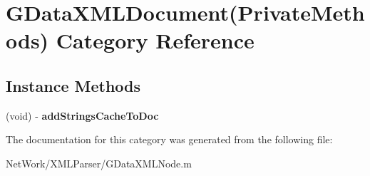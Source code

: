 \hypertarget{category_g_data_x_m_l_document_07_private_methods_08}{\section{G\+Data\+X\+M\+L\+Document(Private\+Methods) Category Reference}
\label{category_g_data_x_m_l_document_07_private_methods_08}
}
\subsection*{Instance Methods}
\begin{DoxyCompactItemize}
\item 
\hypertarget{category_g_data_x_m_l_document_07_private_methods_08_a919a4f1c9925f4d6de2c09a92bfd0f35}{(void) -\/ {\bfseries add\+Strings\+Cache\+To\+Doc}}\label{category_g_data_x_m_l_document_07_private_methods_08_a919a4f1c9925f4d6de2c09a92bfd0f35}

\end{DoxyCompactItemize}


The documentation for this category was generated from the following file\+:\begin{DoxyCompactItemize}
\item 
Net\+Work/\+X\+M\+L\+Parser/G\+Data\+X\+M\+L\+Node.\+m\end{DoxyCompactItemize}
